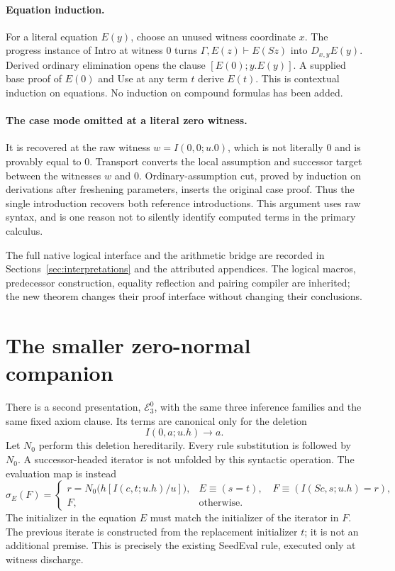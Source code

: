 \documentclass[11pt,letterpaper]{article}
\theoremstyle{definition}\newtheorem{definition}[theorem]{Definition}
\theoremstyle{remark}\newtheorem{remark}[theorem]{Remark}
\begin{document}
\paragraph{Equation induction.}
For a literal equation $E(y)$, choose an unused witness coordinate $x$.
The progress instance of Intro at witness $0$ turns
$\Gamma,E(z)\vdash E(Sz)$ into $D_{x,y}E(y)$. Derived ordinary elimination
opens the clause $[E(0);y.E(y)]$. A supplied base proof of $E(0)$ and Use
at any term $t$ derive $E(t)$. This is contextual induction on equations.
No induction on compound formulas has been added.

\paragraph{The case mode omitted at a literal zero witness.}
It is recovered at the raw witness $w=I(0,0;u.0)$, which is not literally
$0$ and is provably equal to $0$. Transport converts the local assumption
and successor target between the witnesses $w$ and $0$. Ordinary-assumption
cut, proved by induction on derivations after freshening parameters, inserts
the original case proof. Thus the single introduction recovers both
reference introductions. This argument uses raw syntax, and is one reason
not to silently identify computed terms in the primary calculus.

The full native logical interface and the arithmetic bridge are recorded
in Sections~\ref{sec:interpretations} and the attributed appendices. The
logical macros, predecessor construction, equality reflection and pairing
compiler are inherited; the new theorem changes their proof interface
without changing their conclusions.

\section{The smaller zero-normal companion}
\label{sec:zero}

There is a second presentation, $\mathcal E^0_3$, with the same three
inference families and the same fixed axiom clause. Its terms are canonical
only for the deletion
\[
                         I(0,a;u.h)\longrightarrow a.
\]
Let $N_0$ perform this deletion hereditarily. Every rule substitution is
followed by $N_0$. A successor-headed iterator is not unfolded by this
syntactic operation. The evaluation map is instead
\[
 \sigma_E(F)=
 \begin{cases}
  r=N_0\bigl(h[I(c,t;u.h)/u]\bigr),
    &E\equiv(s=t),\quad F\equiv(I(Sc,s;u.h)=r),\\[3pt]
  F,&\text{otherwise}.
 \end{cases}
\]
The initializer in the equation $E$ must match the initializer of the
iterator in $F$. The previous iterate is constructed from the replacement
initializer $t$; it is not an additional premise. This is precisely the
existing SeedEval rule, executed only at witness discharge.
\end{document}
